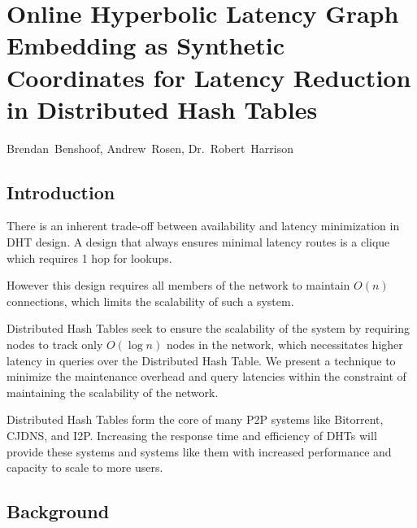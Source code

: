 

\chapter{Online Hyperbolic Latency Graph Embedding as Synthetic Coordinates for Latency Reduction in Distributed Hash Tables}
%
%
%
\begin{center}
Brendan~Benshoof, Andrew~Rosen, Dr.~Robert~Harrison
\end{center}



\section{Introduction}

There is an inherent trade-off between availability and latency minimization in DHT design. 
A design that always ensures minimal latency routes is a clique\cite{li2013zht} which requires 1 hop for lookups.

However this design requires all members of the network to maintain $O(n)$ connections, which limits the scalability of such a system.

Distributed Hash Tables seek to ensure the scalability of the system by requiring nodes to track only $O(\log{n})$ nodes in the network, which necessitates higher latency in queries over the Distributed Hash Table.
We present a technique to minimize the maintenance overhead and query latencies within the constraint of maintaining the scalability of the network.

Distributed Hash Tables form the core of many P2P systems like Bitorrent\cite{jimenez2011kademlia}, CJDNS\cite{hodson2013meshnet}, and I2P\cite{zantout2011i2p}.
Increasing the response time and efficiency of DHTs will provide these systems and systems like them with increased performance and capacity to scale to more users.

\section{Background}

